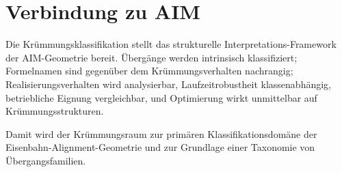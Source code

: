 \section{Verbindung zu AIM}

\begin{summary}
Die Krümmungsklassifikation stellt das strukturelle Interpretations-Framework
der AIM-Geometrie bereit. Übergänge werden intrinsisch klassifiziert;
Formelnamen sind gegenüber dem Krümmungsverhalten nachrangig;
Realisierungsverhalten wird analysierbar, Laufzeitrobustheit klassenabhängig,
betriebliche Eignung vergleichbar, und Optimierung wirkt unmittelbar auf
Krümmungsstrukturen.

Damit wird der Krümmungsraum zur primären Klassifikationsdomäne der
Eisenbahn-Alignment-Geometrie und zur Grundlage einer Taxonomie von
Übergangsfamilien.
\end{summary}
